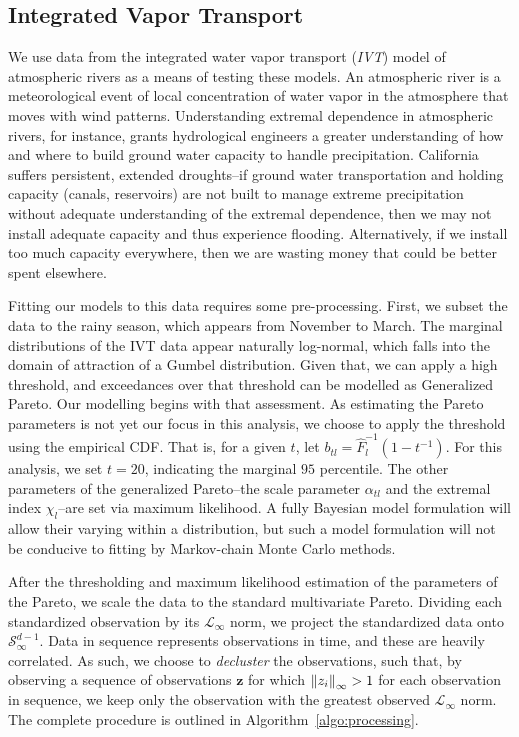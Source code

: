 \subsection{Integrated Vapor Transport}
We use data from the integrated water vapor transport (\emph{IVT}) model \citep{guan2015}
  of atmospheric rivers as a means of testing these models.  An atmospheric river is a meteorological
  event of local concentration of water vapor in the atmosphere that moves with wind patterns.
  Understanding extremal dependence in atmospheric rivers, for instance, grants hydrological engineers
  a greater understanding of how and where to build ground water capacity to handle precipitation.
  California suffers persistent, extended droughts--if ground water transportation and holding capacity
  (canals, reservoirs) are not built to manage extreme precipitation without adequate understanding of
  the extremal dependence, then we may not install adequate capacity and thus experience flooding.
  Alternatively, if we install too much capacity everywhere, then we are wasting money that could be
  better spent elsewhere.

Fitting our models to this data requires some pre-processing. First, we subset the data to the rainy
  season, which appears from November to March.  The marginal distributions of the
  IVT data appear naturally log-normal, which falls into the domain of attraction of a Gumbel
  distribution.  Given that, we can apply a high threshold, and exceedances over that threshold can
  be modelled as Generalized Pareto.  Our modelling begins with that assessment.  As estimating
  the Pareto parameters is not yet our focus in this analysis, we choose to apply the threshold
  using the empirical CDF.  That is, for a given $t$, let $b_{tl} = \hat{F}_l^{-1}(1 - t^{-1})$.  For
  this analysis, we set $t = 20$, indicating the marginal $95$ percentile.  The other parameters of the
  generalized Pareto--the scale parameter $\alpha_{tl}$ and the extremal index $\chi_l$--are set via
  maximum likelihood.  A fully Bayesian model formulation will allow their varying within a
  distribution, but such a model formulation will not be conducive to fitting by Markov-chain Monte
  Carlo methods.

After the thresholding and maximum likelihood estimation of the parameters of the Pareto, we scale
  the data to the standard multivariate Pareto.  Dividing each standardized observation by its
  $\mathcal{L}_{\infty}$ norm, we project the standardized data onto $\mathcal{S}_{\infty}^{d-1}$.
  Data in sequence represents observations in time, and these are heavily correlated.  As such, we
  choose to \emph{decluster} the observations, such that, by observing a sequence of observations
  $\bm{ z}$ for which $\left\lVert z_i \right\rVert_{\infty} > 1$ for each observation in sequence, we keep only the observation
  with the greatest observed $\mathcal{L}_{\infty}$ norm.  The complete procedure is outlined in
  Algorithm~\ref{algo:processing}.

